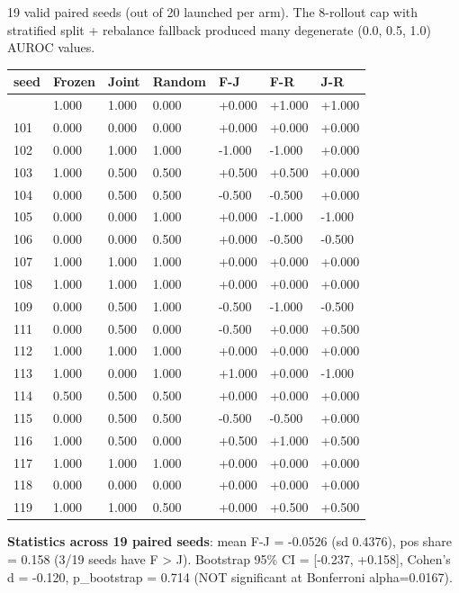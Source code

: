 \documentclass[
]{article}
\newcounter{none} %
\begin{document}
19 valid paired seeds (out of 20 launched per arm). The 8-rollout cap
with stratified split + rebalance fallback produced many degenerate
(0.0, 0.5, 1.0) AUROC values.

{\def\LTcaptype{none} %
\begin{longtable}[]{@{}lllllll@{}}
\toprule\noalign{}
seed & Frozen & Joint & Random & F-J & F-R & J-R \\
\midrule\noalign{}
\endhead
\bottomrule\noalign{}
\endlastfoot
100 & 1.000 & 1.000 & 0.000 & +0.000 & +1.000 & +1.000 \\
101 & 0.000 & 0.000 & 0.000 & +0.000 & +0.000 & +0.000 \\
102 & 0.000 & 1.000 & 1.000 & -1.000 & -1.000 & +0.000 \\
103 & 1.000 & 0.500 & 0.500 & +0.500 & +0.500 & +0.000 \\
104 & 0.000 & 0.500 & 0.500 & -0.500 & -0.500 & +0.000 \\
105 & 0.000 & 0.000 & 1.000 & +0.000 & -1.000 & -1.000 \\
106 & 0.000 & 0.000 & 0.500 & +0.000 & -0.500 & -0.500 \\
107 & 1.000 & 1.000 & 1.000 & +0.000 & +0.000 & +0.000 \\
108 & 1.000 & 1.000 & 1.000 & +0.000 & +0.000 & +0.000 \\
109 & 0.000 & 0.500 & 1.000 & -0.500 & -1.000 & -0.500 \\
111 & 0.000 & 0.500 & 0.000 & -0.500 & +0.000 & +0.500 \\
112 & 1.000 & 1.000 & 1.000 & +0.000 & +0.000 & +0.000 \\
113 & 1.000 & 0.000 & 1.000 & +1.000 & +0.000 & -1.000 \\
114 & 0.500 & 0.500 & 0.500 & +0.000 & +0.000 & +0.000 \\
115 & 0.000 & 0.500 & 0.500 & -0.500 & -0.500 & +0.000 \\
116 & 1.000 & 0.500 & 0.000 & +0.500 & +1.000 & +0.500 \\
117 & 1.000 & 1.000 & 1.000 & +0.000 & +0.000 & +0.000 \\
118 & 0.000 & 0.000 & 0.000 & +0.000 & +0.000 & +0.000 \\
119 & 1.000 & 1.000 & 0.500 & +0.000 & +0.500 & +0.500 \\
\end{longtable}
}

\textbf{Statistics across 19 paired seeds}: mean F-J = -0.0526 (sd
0.4376), pos share = 0.158 (3/19 seeds have F \textgreater{} J).
Bootstrap 95\% CI = {[}-0.237, +0.158{]}, Cohen's d = -0.120,
p\_bootstrap = 0.714 (NOT significant at Bonferroni alpha=0.0167).
\end{document}
